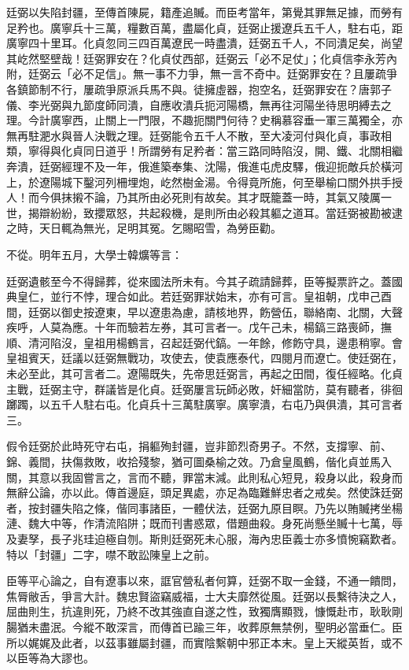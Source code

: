 \begin{pinyinscope}
廷弼以失陷封疆，至傳首陳屍，籍產追贓。而臣考當年，第覺其罪無足據，而勞有足矜也。廣寧兵十三萬，糧數百萬，盡屬化貞，廷弼止援遼兵五千人，駐右屯，距廣寧四十里耳。化貞忽同三四百萬遼民一時盡潰，廷弼五千人，不同潰足矣，尚望其屹然堅壁哉！廷弼罪安在？化貞仗西部，廷弼云「必不足仗」；化貞信李永芳內附，廷弼云「必不足信」。無一事不力爭，無一言不奇中。廷弼罪安在？且屢疏爭各鎮節制不行，屢疏爭原派兵馬不與。徒擁虛器，抱空名，廷弼罪安在？唐郭子儀、李光弼與九節度師同潰，自應收潰兵扼河陽橋，無再往河陽坐待思明縛去之理。今計廣寧西，止關上一門限，不趣扼關門何待？史稱慕容垂一軍三萬獨全，亦無再駐淝水與晉人決戰之理。廷弼能令五千人不散，至大凌河付與化貞，事政相類，寧得與化貞同日道乎！所謂勞有足矜者：當三路同時陷沒，開、鐵、北關相繼奔潰，廷弼經理不及一年，俄進築奉集、沈陽，俄進屯虎皮驛，俄迎扼敵兵於橫河上，於遼陽城下鑿河列柵埋炮，屹然樹金湯。令得竟所施，何至舉榆口關外拱手授人！而今俱抹摋不論，乃其所由必死則有故矣。其才既籠蓋一時，其氣又陵厲一世，揭辯紛紛，致攖眾怒，共起殺機，是則所由必殺其軀之道耳。當廷弼被勘被逮之時，天日輒為無光，足明其冤。乞賜昭雪，為勞臣勸。

不從。明年五月，大學士韓爌等言：

廷弼遺骸至今不得歸葬，從來國法所未有。今其子疏請歸葬，臣等擬票許之。蓋國典皇仁，並行不悖，理合如此。若廷弼罪狀始末，亦有可言。皇祖朝，戊申己酉間，廷弼以御史按遼東，早以遼患為慮，請核地界，飭營伍，聯絡南、北關，大聲疾呼，人莫為應。十年而驗若左券，其可言者一。戊午己未，楊鎬三路喪師，撫順、清河陷沒，皇祖用楊鶴言，召起廷弼代鎬。一年餘，修飭守具，邊患稍寧。會皇祖賓天，廷議以廷弼無戰功，攻使去，使袁應泰代，四閱月而遼亡。使廷弼在，未必至此，其可言者二。遼陽既失，先帝思廷弼言，再起之田間，復任經略。化貞主戰，廷弼主守，群議皆是化貞。廷弼屢言玩師必敗，奸細當防，莫有聽者，徘徊躑躅，以五千人駐右屯。化貞兵十三萬駐廣寧。廣寧潰，右屯乃與俱潰，其可言者三。

假令廷弼於此時死守右屯，捐軀殉封疆，豈非節烈奇男子。不然，支撐寧、前、錦、義間，扶傷救敗，收拾殘黎，猶可圖桑榆之效。乃倉皇風鶴，偕化貞並馬入關，其意以我固嘗言之，言而不聽，罪當末減。此則私心短見，殺身以此，殺身而無辭公論，亦以此。傳首邊庭，頭足異處，亦足為臨難鮮忠者之戒矣。然使誅廷弼者，按封疆失陷之條，偕同事諸臣，一體伏法，廷弼九原目瞑。乃先以賄贓拷坐楊漣、魏大中等，作清流陷阱；既而刊書惑眾，借題曲殺。身死尚懸坐贓十七萬，辱及妻孥，長子兆珪迫極自刎。斯則廷弼死未心服，海內忠臣義士亦多憤惋竊歎者。特以「封疆」二字，噤不敢訟陳皇上之前。

臣等平心論之，自有遼事以來，誆官營私者何算，廷弼不取一金錢，不通一饋問，焦脣敝舌，爭言大計。魏忠賢盜竊威福，士大夫靡然從風。廷弼以長繫待決之人，屈曲則生，抗違則死，乃終不改其強直自遂之性，致獨膺顯戮，慷慨赴市，耿耿剛腸猶未盡泯。今縱不敢深言，而傳首已踰三年，收葬原無禁例，聖明必當垂仁。臣所以娓娓及此者，以茲事雖屬封疆，而實陰繫朝中邪正本末。皇上天縱英哲，或不以臣等為大謬也。


\end{pinyinscope}
